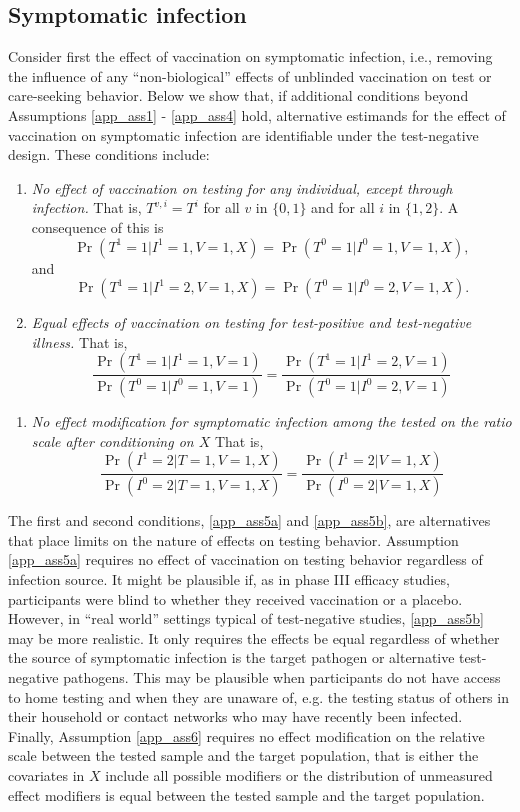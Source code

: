 \begin{appendix}
\begin{refsection}
    \subsection{Symptomatic infection}
    Consider first the effect of vaccination on symptomatic infection, i.e., removing the influence of any ``non-biological'' effects of unblinded vaccination on test or care-seeking behavior. Below we show that, if additional  conditions beyond Assumptions \ref{app_ass1} - \ref{app_ass4} hold, alternative estimands for the effect of vaccination on symptomatic infection are identifiable under the test-negative design. These conditions include:
    \begin{enumerate}[label=\upshape(A5\alph*), ref=A5\alph*]
        \item\label{app_ass5a}\textit{No effect of vaccination on testing for any individual, except through infection.} That is, $T^{v, i} = T^i$ for all $v$ in $\{0, 1\}$ and for all $i$ in $\{1, 2\}$. A consequence of this is 
        \[\Pr(T^1=1|I^1=1, V=1, X) = \Pr(T^0=1|I^0=1, V=1, X),\]
        and 
        \[\Pr(T^1=1|I^1=2, V=1, X) = \Pr(T^0=1|I^0=2, V=1, X).\]
         \item\label{app_ass5b}\textit{Equal effects of vaccination on testing for test-positive and test-negative illness.} That is, 
         \[\dfrac{\Pr(T^1 = 1 | I^1 = 1, V = 1)}{\Pr(T^0 = 1 | I^0 = 1, V = 1)} = \dfrac{\Pr(T^1 = 1 | I^1 = 2, V = 1)}{\Pr(T^0 = 1 | I^0 = 2, V = 1)}\]
    \end{enumerate}
    \begin{enumerate}[label=\upshape(A\arabic*), ref=A\arabic*, start=6]
         \item\label{app_ass6}\textit{No effect modification for symptomatic infection among the tested on the ratio scale after conditioning on $X$} That is, 
          \[\dfrac{\Pr(I^1 = 2 | T = 1, V = 1, X)}{\Pr(I^0 = 2 | T = 1, V = 1, X)} = \dfrac{\Pr(I^1 = 2 | V = 1, X)}{\Pr(I^0 = 2 | V = 1, X)}\]
    \end{enumerate}
    The first and second conditions, \ref{app_ass5a} and \ref{app_ass5b}, are alternatives that place limits on the nature of effects on testing behavior. Assumption \ref{app_ass5a} requires no effect of vaccination on testing behavior regardless of infection source. It might be plausible if, as in phase III efficacy studies, participants were blind to whether they received vaccination or a placebo. However, in ``real world'' settings typical of test-negative studies, \ref{app_ass5b} may be more realistic. It only requires the effects be equal regardless of whether the source of symptomatic infection is the target pathogen or alternative test-negative pathogens. This may be plausible when participants do not have access to home testing and when they are unaware of, e.g. the testing status of others in their household or contact networks who may have recently been infected. Finally, Assumption \ref{app_ass6} requires no effect modification on the relative scale between the tested sample and the target population, that is either the covariates in $X$ include all possible modifiers or the distribution of unmeasured effect modifiers is equal between the tested sample and the target population. 


\end{refsection}
\end{appendix}
